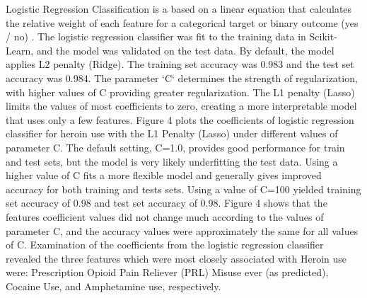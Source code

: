 \documentclass[sigconf]{acmart}
\begin{document}
Logistic Regression Classification is a based on a linear equation that 
calculates the relative weight of each feature for a categorical target or 
binary outcome (yes / no) \cite{raschka17}. The logistic regression classifier 
was fit to the training data in Scikit-Learn, and the model was validated on 
the test data. By default, the model applies L2 penalty (Ridge). The training 
set accuracy was 0.983 and the test set accuracy was 0.984. The parameter `C` 
determines the strength of regularization, with higher values of C providing
greater regularization. The L1 penalty (Lasso) limits the values of most 
coefficients to zero, creating a more interpretable model that uses only a 
few features. Figure 4 plots the coefficients of logistic regression classifier 
for heroin use with the L1 Penalty (Lasso) under different values of parameter 
C. The default setting, C=1.0, provides good performance for train and test 
sets, but the model is very likely underfitting the test data. Using a higher
value of C fits a more flexible model and generally gives improved accuracy 
for both training and tests sets. Using a value of C=100 yielded training set
accuracy of 0.98 and test set accuracy of 0.98. Figure 4 shows that the 
features coefficient values did not change much according to the values of
parameter C, and the accuracy values were approximately the same for all 
values of C. Examination of the coefficients from the logistic regression 
classifier revealed the three features which were most closely associated 
with Heroin use were: Prescription Opioid Pain Reliever (PRL) Misuse ever 
(as predicted), Cocaine Use, and Amphetamine use, respectively.
\end{document}

